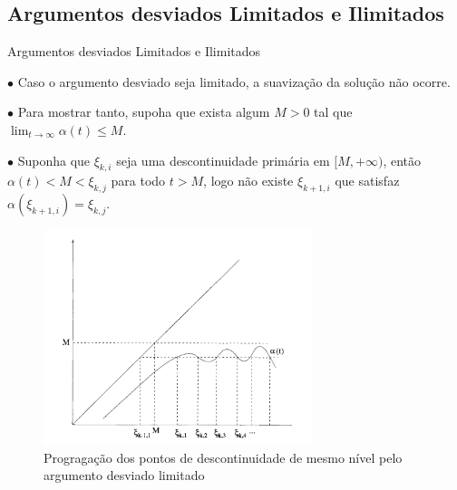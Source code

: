 \documentclass{beamer}
\theoremstyle{plain}
\theoremstyle{definition}
\begin{document}

\subsection{Argumentos desviados Limitados e Ilimitados}
\begin{frame}{Argumentos desviados Limitados e Ilimitados}

    \scriptsize
    $\bullet$ Caso o argumento desviado seja limitado, a suavização da solução não ocorre.

    $\bullet$ Para mostrar tanto, supoha que exista algum $M>0$ tal que \( \lim_{t \to \infty} \alpha(t) \leq M \).

    $\bullet$ Suponha que $\xi_{k, i}$ seja uma descontinuidade primária em $[M, +\infty)$, então $\alpha(t) < M < \xi_{k, j}$ para todo $t > M$, logo não existe $\xi_{k+1, i}$ que satisfaz $\alpha(\xi_{k+1, i}) = \xi_{k, j}$.

    \begin{figure}
        \begin{center}
            \includegraphics[width=0.7\textwidth, height=0.5\textheight]{retardo_limitado.png}
        \end{center}
        \caption{\footnotesize  Progragação dos pontos de descontinuidade de mesmo nível pelo argumento desviado limitado}\label{fig:argumento desviado_limitado}
    \end{figure}


\end{frame}
\end{document}
